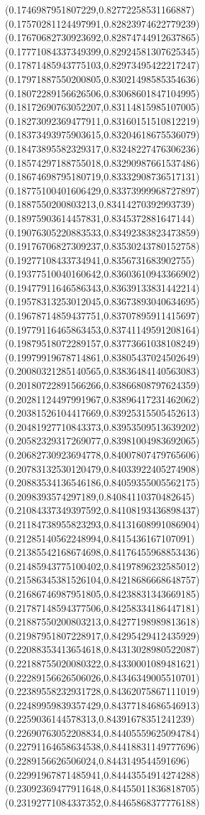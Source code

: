 \documentclass[12pt]{article}
\theoremstyle{plain}
\theoremstyle{definition}
\theoremstyle{remark}
\begin{document}
\begin{figure}
{  (0.1746987951807229,0.82772258531166887)%
  (0.17570281124497991,0.82823974622779239)%
  (0.17670682730923692,0.82874744912637865)%
  (0.17771084337349399,0.82924581307625345)%
  (0.17871485943775103,0.82973495422217247)%
  (0.17971887550200805,0.83021498585354636)%
  (0.18072289156626506,0.83068601847104995)%
  (0.18172690763052207,0.83114815985107005)%
  (0.18273092369477911,0.83160151510812219)%
  (0.18373493975903615,0.83204618675536079)%
  (0.18473895582329317,0.83248227476306236)%
  (0.18574297188755018,0.83290987661537486)%
  (0.18674698795180719,0.83332908736517131)%
  (0.18775100401606429,0.83373999968727897)%
  (0.1887550200803213,0.83414270392993739)%
  (0.18975903614457831,0.8345372881647144)%
  (0.19076305220883533,0.83492383823473859)%
  (0.19176706827309237,0.83530243780152758)%
  (0.19277108433734941,0.8356731683902755)%
  (0.19377510040160642,0.83603610943366902)%
  (0.19477911646586343,0.83639133831442214)%
  (0.19578313253012045,0.83673893040634695)%
  (0.19678714859437751,0.83707895911415697)%
  (0.19779116465863453,0.83741149591208164)%
  (0.19879518072289157,0.83773661038108249)%
  (0.19979919678714861,0.83805437024502649)%
  (0.20080321285140565,0.83836484140563083)%
  (0.20180722891566266,0.83866808797624359)%
  (0.20281124497991967,0.83896417231462062)%
  (0.20381526104417669,0.83925315505452613)%
  (0.20481927710843373,0.83953509513639202)%
  (0.20582329317269077,0.83981004983692065)%
  (0.20682730923694778,0.84007807479765606)%
  (0.20783132530120479,0.84033922405274908)%
  (0.20883534136546186,0.84059355005562175)%
  (0.2098393574297189,0.84084110370482645)%
  (0.21084337349397592,0.84108193436898437)%
  (0.21184738955823293,0.84131608991086904)%
  (0.21285140562248994,0.8415436167107091)%
  (0.21385542168674698,0.84176455968853436)%
  (0.21485943775100402,0.84197896232585012)%
  (0.21586345381526104,0.84218686668648757)%
  (0.21686746987951805,0.84238831343669185)%
  (0.21787148594377506,0.84258334186447181)%
  (0.21887550200803213,0.84277198989813618)%
  (0.21987951807228917,0.84295429412435929)%
  (0.22088353413654618,0.84313028980522087)%
  (0.22188755020080322,0.84330001089481621)%
  (0.22289156626506026,0.84346349005510701)%
  (0.22389558232931728,0.84362075867111019)%
  (0.22489959839357429,0.84377184686546913)%
  (0.2259036144578313,0.84391678351241239)%
  (0.22690763052208834,0.84405559625094784)%
  (0.22791164658634538,0.84418831149777696)%
  (0.2289156626506024,0.8443149544591696)%
  (0.22991967871485941,0.84443554914274288)%
  (0.23092369477911648,0.84455011836818705)%
  (0.23192771084337352,0.84465868377776188)%
}
\end{figure}
\end{document}
